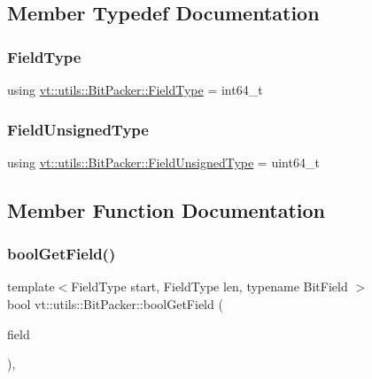 \subsection{Member Typedef Documentation}
\mbox{\label{structvt_1_1utils_1_1_bit_packer_a23024285425933c1f10c8fc3942f9beb}} 
\subsubsection{\texorpdfstring{Field\+Type}{FieldType}}
{\footnotesize\ttfamily using \hyperlink{structvt_1_1utils_1_1_bit_packer_a23024285425933c1f10c8fc3942f9beb}{vt\+::utils\+::\+Bit\+Packer\+::\+Field\+Type} =  int64\+\_\+t}

\mbox{\label{structvt_1_1utils_1_1_bit_packer_a0bbc37c21a19e6c5311c6e9282a1e6f8}} 
\subsubsection{\texorpdfstring{Field\+Unsigned\+Type}{FieldUnsignedType}}
{\footnotesize\ttfamily using \hyperlink{structvt_1_1utils_1_1_bit_packer_a0bbc37c21a19e6c5311c6e9282a1e6f8}{vt\+::utils\+::\+Bit\+Packer\+::\+Field\+Unsigned\+Type} =  uint64\+\_\+t}



\subsection{Member Function Documentation}
\mbox{\label{structvt_1_1utils_1_1_bit_packer_ad913a3121b60959166b1fba7de596cff}} 
\subsubsection{\texorpdfstring{bool\+Get\+Field()}{boolGetField()}}
{\footnotesize\ttfamily template$<$Field\+Type start, Field\+Type len, typename Bit\+Field $>$ \\
bool vt\+::utils\+::\+Bit\+Packer\+::bool\+Get\+Field (\begin{DoxyParamCaption}\item[{Bit\+Field const \&}]{field }\end{DoxyParamCaption})\hspace{0.3cm}{\ttfamily [inline]}, {\ttfamily [static]}}

